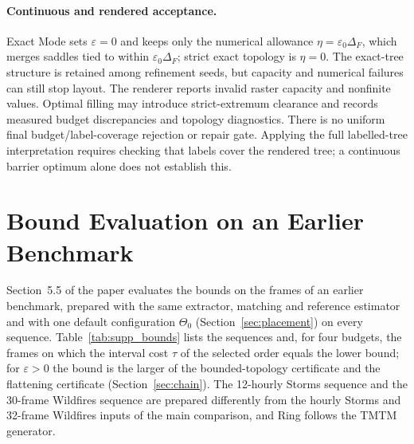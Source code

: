 \documentclass{vgtc}                %
\begin{document}
\paragraph{Continuous and rendered acceptance.}
Exact Mode sets $\varepsilon=0$ and keeps only the numerical allowance $\eta=\varepsilon_0\Delta_F$, which merges saddles tied to within $\varepsilon_0\Delta_F$; strict exact topology is $\eta=0$. The exact-tree structure is retained among refinement seeds, but capacity and numerical failures can still stop layout. The renderer reports invalid raster capacity and nonfinite values. Optimal filling may introduce strict-extremum clearance and records measured budget discrepancies and topology diagnostics. There is no uniform final budget/label-coverage rejection or repair gate. Applying the full labelled-tree interpretation requires checking that labels cover the rendered tree; a continuous barrier optimum alone does not establish this.


\section{Bound Evaluation on an Earlier Benchmark}\label{sec:supp_bounds}
Section~5.5 of the paper evaluates the bounds on the frames of an earlier benchmark, prepared with the same extractor, matching and reference estimator and with one default configuration $\Theta_0$ (Section~\ref{sec:placement}) on every sequence. Table~\ref{tab:supp_bounds} lists the sequences and, for four budgets, the frames on which the interval cost $\tau$ of the selected order equals the lower bound; for $\varepsilon>0$ the bound is the larger of the bounded-topology certificate and the flattening certificate (Section~\ref{sec:chain}). The 12-hourly Storms sequence and the 30-frame Wildfires sequence are prepared differently from the hourly Storms and 32-frame Wildfires inputs of the main comparison, and Ring follows the TMTM generator.
\end{document}
